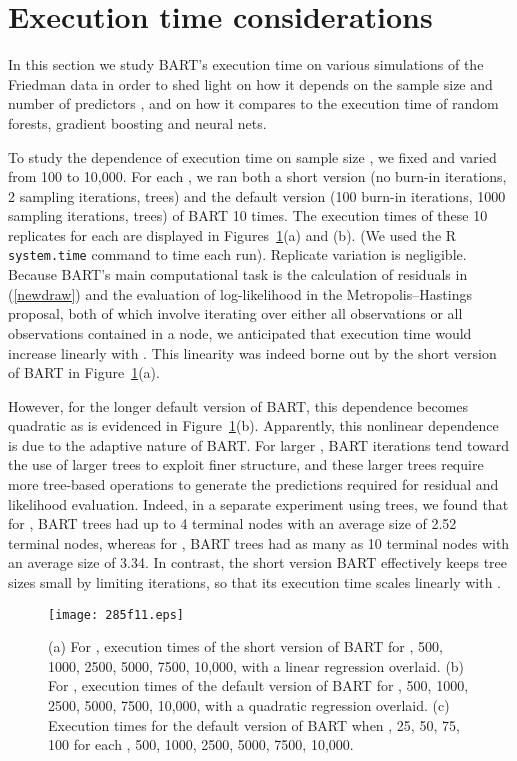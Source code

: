 \documentclass[aoas,nameyear,dvips]{arximspdf}
\begin{document}
\section{Execution time considerations}\label{sec:executiontime}

In this section we study BART's execution time on various simulations of the Friedman data
 in order to shed light on how it depends on the sample size  and
number of predictors , and on how it compares to the execution time
of random forests, gradient boosting and neural nets.

To study the dependence of execution time on sample size , we fixed
 and varied  from 100 to 10,000.  For each , we ran both
a short version (no burn-in iterations, 2 sampling iterations,  trees) and the default version (100 burn-in iterations, 1000
sampling iterations,  trees) of BART 10 times. The execution
times of these 10 replicates for each   are displayed in
Figures~\ref{fig:times}(a) and (b). (We used the R \texttt{system.time}
command to time each run). Replicate variation is negligible. Because
BART's main computational task is the calculation of residuals in
(\ref{newdraw}) and the evaluation of log-likelihood in the
Metropolis--Hastings proposal, both of which involve iterating over
either all  observations or all observations contained in a node, we
anticipated that execution time would increase linearly with .  This
linearity was indeed borne out by the short version of BART in
Figure~\ref{fig:times}(a).

However, for the longer default version of BART, this dependence
becomes quadratic as is evidenced in Figure~\ref{fig:times}(b).
Apparently, this nonlinear dependence is due to the adaptive nature of
BART.  For larger , BART iterations tend toward the use of larger
trees to exploit finer structure, and these larger trees require more
tree-based operations to generate the predictions required for residual
and likelihood evaluation.  Indeed, in a separate experiment using  trees, we found that for , BART trees had up to 4 terminal
nodes with an average size of 2.52 terminal nodes, whereas for , BART trees had as many as 10 terminal nodes with an average
size of 3.34. In contrast, the short version BART effectively keeps
tree sizes small by limiting iterations, so that its execution time
scales linearly with .


\begin{figure}

\texttt{[image: 285f11.eps]}

\caption{\textup{(a)} For , execution times of the short
version of BART for , 500, 1000, 2500, 5000, 7500, 10,000, with a linear
regression overlaid. \textup{(b)} For , execution times
of the default version of BART for , 500, 1000, 2500, 5000, 7500, 10,000,  with a quadratic
regression overlaid.
\textup{(c)} Execution times for the default version of BART
when , 25, 50, 75, 100 for each , 500, 1000, 2500, 5000, 7500, 10,000.}\label{fig:times}
\end{figure}
\end{document}
